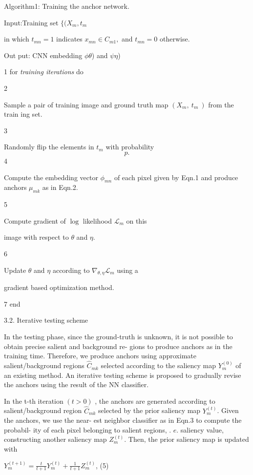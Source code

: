 \documentclass[a4paper,10pt]{article}
\begin{document}
Algorithm1: Training the anchor network.

Input:Training set $\{(X_{m}, t_{m}$

in which $t_{mn}=1$ indicates $x_{mn}\in C_{m1},$ and $t_{mn}=0$ otherwise.

Out put: CN$\mathrm{N}$ embedding $\phi \theta$) and $\psi \eta$)

1 for {\it training iterations} do

2

Sample a pair of training image and ground truth map $(X_{m},\ t_{m}\ )$ from the train ing set.

3

Randomly flip the elements in $t_{m}$ with probability
$$
p.
$$
4

Compute the embedding vector $\phi_{mn}$ of each pixel given by Eqn.1 and produce anchors $\mu_{mk}$ as in Eqn.2.

5

Compute gradient of $\log$ likelihood $\mathcal{L}_{m}$ on this

image with respect to $\theta$ and $\eta.$

6

Update $\theta$ and $\eta$ according to $\nabla_{\theta,\eta}\mathcal{L}_{m}$ using a

gradient based optimization method.

7 end

3.2. Iterative testing scheme

In the testing phase, since the ground-truth is unknown, it is not possible to obtain precise salient and background re- gions to produce anchors as in the training time. Therefore, we produce anchors using approximate salient/background regions $\hat{C}_{mk}$ selected according to the saliency map $Y_{m}^{(0)}$ of an existing method. An iterative testing scheme is proposed to gradually revise the anchors using the result of the NN classifier.

In the t-th iteration $(t>0)$ , the anchors are generated according to salient/background region $\hat{C}_{mk}$ selected by the prior saliency map $Y_{m}^{(t)}$. Given the anchors, we use the near- est neighbor classifier as in Eqn.3 to compute the probabil- ity of each pixel belonging to salient regions, . $e$. saliency value, constructing another saliency map $Z_{m}^{(t)}$. Then, the prior saliency map is updated with

$Y_{m}^{(t+1)}=\displaystyle \frac{t}{t+1}Y_{m}^{(t)}+\frac{1}{t+1}Z_{m}^{(t)}$, (5)
\end{document}
